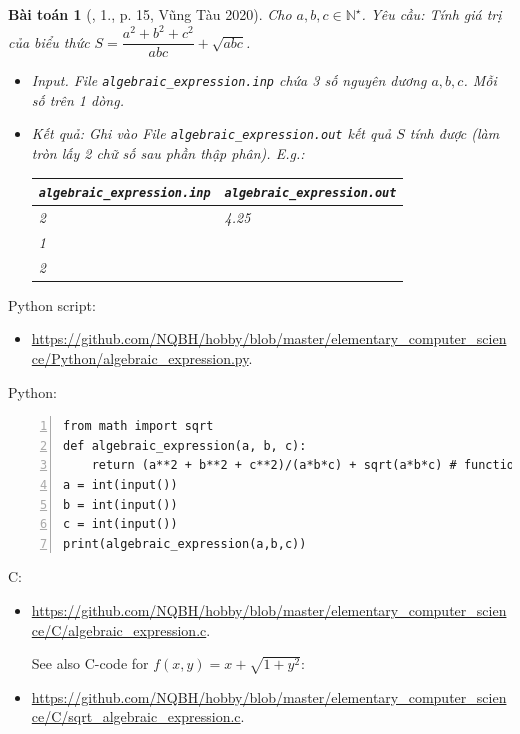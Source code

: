 \documentclass{article}
\newtheorem{baitoan}{Bài toán}
\begin{document}
\begin{baitoan}[\cite{VietSTEM2021}, 1., p. 15, Vũng Tàu 2020]
	Cho $a,b,c\in\mathbb{N}^\star$. {\sf Yêu cầu:} Tính giá trị của biểu thức $S = \dfrac{a^2 + b^2 + c^2}{abc} + \sqrt{abc}$.
	\begin{itemize}
		\item {\sf Input.} File \verb|algebraic_expression.inp| chứa 3 số nguyên dương $a,b,c$. Mỗi số trên 1 dòng.
		\item {\sf Kết quả:} Ghi vào File \verb|algebraic_expression.out| kết quả $S$ tính được (làm tròn lấy 2 chữ số sau phần thập phân). E.g.:
		\begin{table}[H]
			\centering
			\begin{tabular}{|l|l|}
				\hline
				\verb|algebraic_expression.inp| & \verb|algebraic_expression.out| \\
				\hline
				2 & 4.25 \\
				1 &  \\
				2 &  \\
				\hline
			\end{tabular}
		\end{table}
	\end{itemize}
\end{baitoan}
Python script:
\begin{itemize}
	\item \url{https://github.com/NQBH/hobby/blob/master/elementary_computer_science/Python/algebraic_expression.py}.
\end{itemize}
Python:
\begin{Verbatim}[numbers=left,xleftmargin=5mm]
from math import sqrt
def algebraic_expression(a, b, c):
    return (a**2 + b**2 + c**2)/(a*b*c) + sqrt(a*b*c) # function f(a,b,c) can be modified
a = int(input())
b = int(input())
c = int(input())
print(algebraic_expression(a,b,c))
\end{Verbatim}
C:
\begin{itemize}
	\item \url{https://github.com/NQBH/hobby/blob/master/elementary_computer_science/C/algebraic_expression.c}.
	
	See also C-code for $f(x,y) = x + \sqrt{1 + y^2}$:
	\item \url{https://github.com/NQBH/hobby/blob/master/elementary_computer_science/C/sqrt_algebraic_expression.c}.
\end{itemize}
\end{document}
